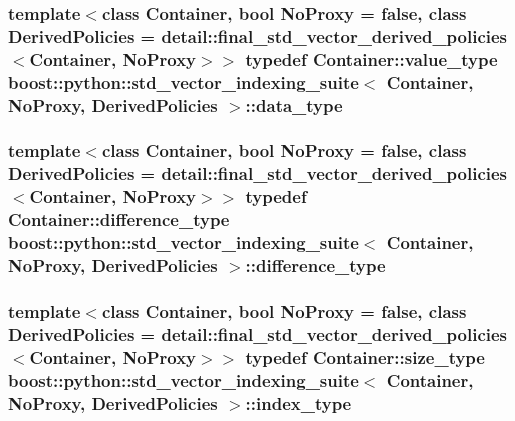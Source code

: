 \subsubsection[{data\+\_\+type}]{\setlength{\rightskip}{0pt plus 5cm}template$<$class Container, bool No\+Proxy = false, class Derived\+Policies = detail\+::final\+\_\+std\+\_\+vector\+\_\+derived\+\_\+policies$<$\+Container, No\+Proxy$>$$>$ typedef Container\+::value\+\_\+type {\bf boost\+::python\+::std\+\_\+vector\+\_\+indexing\+\_\+suite}$<$ Container, No\+Proxy, Derived\+Policies $>$\+::{\bf data\+\_\+type}}\label{classboost_1_1python_1_1std__vector__indexing__suite_a9c3db9df25d6966c54154275377c94ce}
\hypertarget{classboost_1_1python_1_1std__vector__indexing__suite_a546a5483c04385c153a5987f5ba16709}{}
\subsubsection[{difference\+\_\+type}]{\setlength{\rightskip}{0pt plus 5cm}template$<$class Container, bool No\+Proxy = false, class Derived\+Policies = detail\+::final\+\_\+std\+\_\+vector\+\_\+derived\+\_\+policies$<$\+Container, No\+Proxy$>$$>$ typedef Container\+::difference\+\_\+type {\bf boost\+::python\+::std\+\_\+vector\+\_\+indexing\+\_\+suite}$<$ Container, No\+Proxy, Derived\+Policies $>$\+::{\bf difference\+\_\+type}}\label{classboost_1_1python_1_1std__vector__indexing__suite_a546a5483c04385c153a5987f5ba16709}
\hypertarget{classboost_1_1python_1_1std__vector__indexing__suite_a3124827b535a08798fbd33b9fee7b668}{}
\subsubsection[{index\+\_\+type}]{\setlength{\rightskip}{0pt plus 5cm}template$<$class Container, bool No\+Proxy = false, class Derived\+Policies = detail\+::final\+\_\+std\+\_\+vector\+\_\+derived\+\_\+policies$<$\+Container, No\+Proxy$>$$>$ typedef Container\+::size\+\_\+type {\bf boost\+::python\+::std\+\_\+vector\+\_\+indexing\+\_\+suite}$<$ Container, No\+Proxy, Derived\+Policies $>$\+::{\bf index\+\_\+type}}\label{classboost_1_1python_1_1std__vector__indexing__suite_a3124827b535a08798fbd33b9fee7b668}
\hypertarget{classboost_1_1python_1_1std__vector__indexing__suite_aad8e15443d4d920d6b15e1781fba568a}{}
